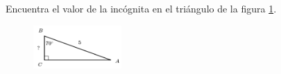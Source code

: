 \question[15]  Encuentra el valor de la incógnita en el triángulo de la figura \ref{fig:lados_functrig_14}.
\begin{figure}[H]
    \begin{center}
        \includegraphics[width=0.3\textwidth]{../images/lados_functrig_14.png}
    \end{center}
    \caption{}
    \label{fig:lados_functrig_14}
\end{figure}